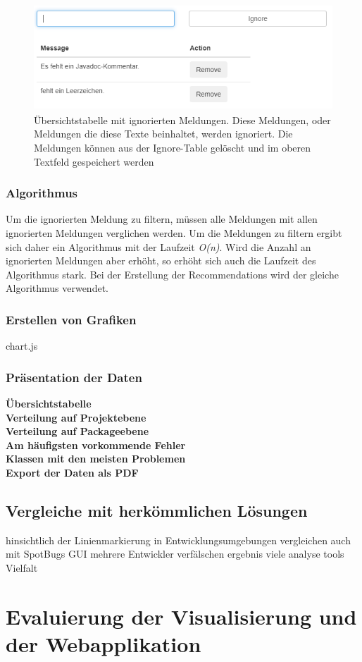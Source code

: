 \begin{figure}[tp]
  \centering
  \includegraphics[height=4cm]{images/ignoreTable.PNG}
 \caption[Übersichtstabelle mit ignorierten Meldungen. Diese Meldungen, oder Meldungen die diese Texte beinhaltet, werden ignoriert. Die Meldungen können aus der Ignore-Table gelöscht und im oberen Textfeld gespeichert werden.]{Übersichtstabelle mit ignorierten Meldungen. Diese Meldungen, oder Meldungen die diese Texte beinhaltet, werden ignoriert. Die Meldungen können aus der Ignore-Table gelöscht und im oberen Textfeld gespeichert werden}
  \label{fig:ignoredMessages}
\end{figure}

\subsubsection*{Algorithmus}
Um die ignorierten Meldung zu filtern, müssen alle Meldungen mit allen ignorierten Meldungen verglichen werden. Um die Meldungen zu filtern ergibt sich daher ein Algorithmus mit der Laufzeit \textit{O(n)}. Wird die Anzahl an ignorierten Meldungen aber erhöht, so erhöht sich auch die Laufzeit des Algorithmus stark. Bei der Erstellung der Recommendations wird der gleiche Algorithmus verwendet.

\subsubsection{Erstellen von Grafiken}
chart.js
\subsubsection{Präsentation der Daten}
\textbf{Übersichtstabelle} \\
\textbf{Verteilung auf Projektebene} \\
\textbf{Verteilung auf Packageebene} \\
\textbf{Am häufigsten vorkommende Fehler} \\
\textbf{Klassen mit den meisten Problemen} \\
\textbf{Export der Daten als PDF} \\
\subsection{Vergleiche mit herkömmlichen Lösungen} 
hinsichtlich der Linienmarkierung in Entwicklungsumgebungen
vergleichen auch mit SpotBugs GUI
mehrere Entwickler verfälschen ergebnis
viele analyse tools Vielfalt
\section{Evaluierung der Visualisierung und der Webapplikation} 